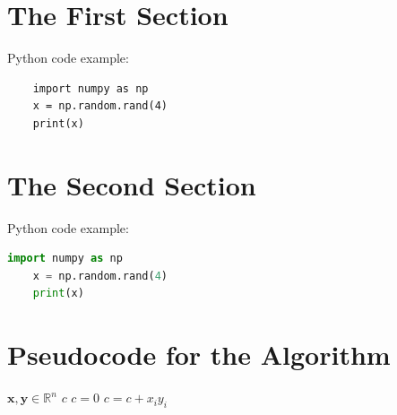 \documentclass[12pt]{article}
\begin{document}
\section{The First Section}
Python code example:
\begin{verbatim}
    import numpy as np
    x = np.random.rand(4)
    print(x)
\end{verbatim}

\section{The Second Section}
Python code example:
\begin{lstlisting}[language=Python, caption=Example Python Code]
    import numpy as np
    x = np.random.rand(4)
    print(x)
\end{lstlisting}

\section{Pseudocode for the Algorithm}
\begin{algorithm}
\renewcommand{\algorithmicrequire}{\textbf{Input:}} %
\renewcommand{\algorithmicensure}{\textbf{Output:}} %
\caption{Inner product of vectors}
\begin{algorithmic}[1]
    \REQUIRE $\boldsymbol{x}, \boldsymbol{y} \in \mathbb{R}^n$
    \ENSURE $c$
    \STATE $c=0$
        \STATE $c=c+x_i y_i$
    \ENDFOR
\end{algorithmic}
\end{algorithm}

\end{document}
